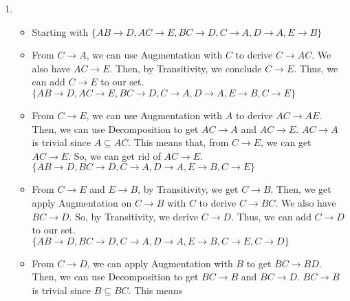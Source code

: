 \documentclass[12pt]{article}
\begin{document}
\begin{enumerate}
  \item
    \begin{itemize}
      \item Starting with $\{AB \longrightarrow D, AC \longrightarrow E, BC
            \longrightarrow D, C \longrightarrow A, D \longrightarrow A, E
            \longrightarrow B\}$
      \item From $C \longrightarrow A$, we can use Augmentation with $C$ to
            derive $C \longrightarrow AC$. We also have $AC \longrightarrow E$.
            Then, by Transitivity, we conclude $C \longrightarrow E$. Thus, we
            can add $C \longrightarrow E$ to our set. \\
            $\{AB \longrightarrow D, AC \longrightarrow E, BC \longrightarrow
            D, C \longrightarrow A, D \longrightarrow A, E \longrightarrow B, C
            \longrightarrow E\}$
      \item From $C \longrightarrow E$, we can use Augmentation with $A$ to
            derive $AC \longrightarrow AE$. Then, we can use Decomposition to
            get $AC \longrightarrow A$ and $AC \longrightarrow E$. $AC
            \longrightarrow A$ is trivial since $A \subseteq AC$. This means
            that, from $C \longrightarrow E$, we can get $AC \longrightarrow E$.
            So, we can get rid of $AC \longrightarrow E$. \\
            $\{AB \longrightarrow D, BC \longrightarrow D, C \longrightarrow A,
            D \longrightarrow A, E \longrightarrow B, C \longrightarrow E\}$
      \item From $C \longrightarrow E$ and $E \longrightarrow B$, by
            Transitivity, we get $C \longrightarrow B$. Then, we get apply
            Augmentation on $C \longrightarrow B$ with $C$ to derive $C
            \longrightarrow BC$. We also have $BC \longrightarrow D$. So, by
            Transitivity, we derive $C \longrightarrow D$. Thus, we can add $C
            \longrightarrow D$ to our set. \\
            $\{AB \longrightarrow D, BC \longrightarrow D, C \longrightarrow A,
            D \longrightarrow A, E \longrightarrow B, C \longrightarrow E, C
            \longrightarrow D\}$
      \item From $C \longrightarrow D$, we can apply Augmentation with $B$ to
            get $BC \longrightarrow BD$. Then, we can use Decomposition to get
            $BC \longrightarrow B$ and $BC \longrightarrow D$. $BC
            \longrightarrow B$ is trivial since $B \subseteq BC$. This means

\end{itemize}
\end{enumerate}
\end{document}
